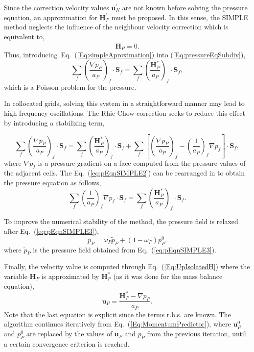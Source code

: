 \documentclass[final,3p,times,11pt,onecolumn]{myElsarticle}
\numberwithin{equation}{section}
\begin{document}
Since the correction velocity values $\boldsymbol{u}_N^{'}$ are not known before solving the pressure equation, an approximation for $\boldsymbol{H}_P^{'}$ must be proposed. In this sense, the SIMPLE method neglects the influence of the neighbour velocity correction which is equivalent to,
\begin{equation}
\label{Eq:simpleAproximation}
\boldsymbol{H}_P^{'} = 0.
\end{equation}
Thus, introducing~Eq.~(\ref{Eq:simpleAproximation}) into (\ref{Eq:pressureEqSubdiv}),
\begin{equation}
\sum_{f} 
\left(
\dfrac
{
\nabla p_P}
{a_P}
\right)_f
\cdotp 
\textbf{S}_{f}
=
\sum_f 
\left(
\dfrac
{
\boldsymbol{H}_P^*
}
{
a_P
}
\right)_f
\cdot
\boldsymbol{S}_f,
\label{eq:div-free5}  
\end{equation}
which is a Poisson problem for the pressure.

In collocated grids, solving this system in a straightforward manner may lead to high-frequency oscillations. The Rhie-Chow correction \cite{rhiechow} seeks to reduce this effect by introducing a stabilizing term, 

\begin{equation}
\label{eq:pEqnSIMPLE2}
\sum_{f} 
\left(
\dfrac
{
\nabla p_P}
{a_P}
\right)_f
\cdotp 
\textbf{S}_{f} 
=
\sum_f 
\left(
\dfrac{
\boldsymbol{H}_P^*
}
{
a_P
}
\right)_f
\cdot
\boldsymbol{S}_f 
+
\sum_f  
\left[
\left(
\frac{\nabla p_P}{a_P}
\right)_f
- 
\left(
\frac{1}{a_P}
\right)_f 
\nabla p_f
\right]
\cdot 
\boldsymbol{S}_f,
\end{equation}
where $\nabla p_f$ is a pressure gradient on a face computed from the pressure values of the adjacent cells. The Eq.~(\ref{eq:pEqnSIMPLE2}) can be rearranged in to obtain the pressure equation as follows,
\begin{equation}\label{eq:pEqnSIMPLE3}
\sum_f \left(\frac{1}{a_P}\right)_f \nabla p_f 
\cdot
\boldsymbol{S}_f 
=  \sum_f \left(\frac{\boldsymbol{H}_P^*}{a_P}\right)_f \cdot \boldsymbol{S}_f.
\end{equation}

To improve the numerical stability of the method, the pressure field is relaxed after Eq.~(\ref{eq:pEqnSIMPLE3}),
\begin{equation}
\label{eq:relaxP}
p_P
=
\omega_P \tilde{p}_P + (1-\omega_P) p_P^0.
\end{equation}
\noindent where $\tilde{p}_P$ is the pressure field obtained from Eq.~(\ref{eq:pEqnSIMPLE3}).

Finally, the velocity value is computed through Eq.~(\ref{Eq:UpIsolatedH}) where the variable $\boldsymbol{H}_P$ is approximated by $\boldsymbol{H}_P^{*}$ (as it was done for the mass balance equation),
\begin{equation}
\label{eq:SIMPLECorr}
\boldsymbol{u}_P
=
\dfrac
{
\boldsymbol{H}_P^*
- 
\nabla p_P}
{a_P}.
\end{equation}
Note that the last equation is explicit since the terms r.h.s. are known. The algorithm continues iteratively from Eq.~(\ref{Eq:MomentumPredictor}), where $\boldsymbol{u}_P^0$ and $p_P^0$ are replaced by the values of $\boldsymbol{u}_P$ and $p_P$ from the previous iteration, until a certain convergence criterion is reached.
\end{document}
